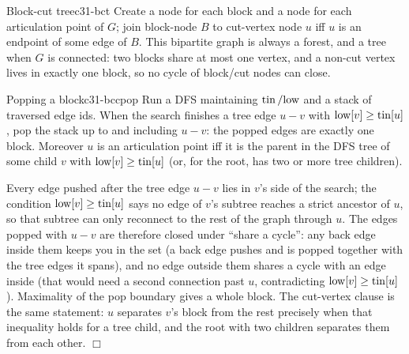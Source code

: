 \begin{definition}{Block-cut tree}{c31-bct}
Create a node for each block and a node for each articulation point of \(G\);
join block-node \(B\) to cut-vertex node \(u\) iff \(u\) is an endpoint of some
edge of \(B\).  This bipartite graph is always a forest, and a tree when \(G\) is
connected: two blocks share at most one vertex, and a non-cut vertex lives in
exactly one block, so no cycle of block/cut nodes can close.
\end{definition}

\begin{theorem}{Popping a block}{c31-bccpop}
Run a DFS maintaining \(\operatorname{tin}/\mathrm{low}\) and a stack of traversed edge ids.
When the search finishes a tree edge \(u\!-\!v\) with \(\mathrm{low}[v]\ge\operatorname{tin}[u]\),
pop the stack up to and including \(u\!-\!v\): the popped edges are exactly one
block.  Moreover \(u\) is an articulation point iff it is the parent in the DFS
tree of some child \(v\) with \(\mathrm{low}[v]\ge\operatorname{tin}[u]\) (or, for the root, has
two or more tree children).
\end{theorem}

\begin{proofbox}
Every edge pushed after the tree edge \(u\!-\!v\) lies in \(v\)'s side of the
search; the condition \(\mathrm{low}[v]\ge\operatorname{tin}[u]\) says no edge of \(v\)'s
subtree reaches a strict ancestor of \(u\), so that subtree can only reconnect to
the rest of the graph through \(u\).  The edges popped with \(u\!-\!v\) are
therefore closed under ``share a cycle'': any back edge inside them keeps you in
the set (a back edge pushes and is popped together with the tree edges it spans),
and no edge outside them shares a cycle with an edge inside (that would need a
second connection past \(u\), contradicting \(\mathrm{low}[v]\ge\operatorname{tin}[u]\)).  Maximality
of the pop boundary gives a whole block.  The cut-vertex clause is the same
statement: \(u\) separates \(v\)'s block from the rest precisely when that
inequality holds for a tree child, and the root with two children separates them
from each other. \(\Box\)
\end{proofbox}

